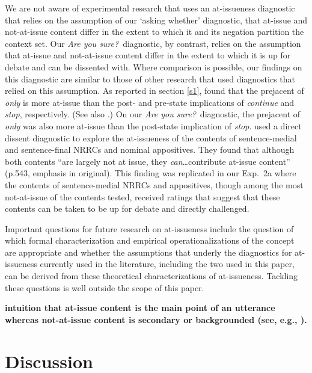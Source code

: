 \documentclass[11pt,fleqn]{article}
\newcommand{\6}{\mbox{$[\hspace*{-.6mm}[$}}
\newcommand{\9}{\mbox{$]\hspace*{-.6mm}]$}}
\begin{document}
We are not aware of experimental research that uses an at-issueness diagnostic that relies on the assumption of our `asking whether' diagnostic, that at-issue and not-at-issue content differ in the extent to which it and its negation partition the context set. Our {\em Are you sure?}~diagnostic, by contrast, relies on the assumption that at-issue and not-at-issue content differ in the extent to which it is up for debate and can be dissented with. Where comparison is possible, our findings on this diagnostic are similar to those of other research that used diagnostics that relied on this assumption. As reported in section \ref{s1}, \citet{amaral-etal11} found that the prejacent of {\em only} is more at-issue than the post- and pre-state implications of {\em continue} and {\em stop}, respectively. (See also \citealt{cummins-etal2012}.) On our {\em Are you sure?}~diagnostic, the prejacent of {\em only} was also more at-issue than the post-state implication of {\em stop}. \citet{syrett-koev2015} used a direct dissent diagnostic to explore the at-issueness of the contents of sentence-medial and sentence-final NRRCs and nominal appositives. They found that although both contents ``are largely not at issue, they {\em can}\ldots contribute at-issue content'' (p.543, emphasis in original). This finding was replicated in our Exp.~2a where the contents of sentence-medial NRRCs and appositives, though among the most not-at-issue of the contents tested, received ratings that suggest that these contents can be taken to be up for debate and directly challenged.

Important questions for future research on at-issueness include the question of which formal characterization and empirical operationalizations of the concept are appropriate and whether the assumptions that underly the diagnostics for at-issueness currently used in the literature, including the two used in this paper, can be derived from these theoretical characterizations of at-issueness. Tackling these questions is well outside the scope of this paper.
 
{\bf intuition that at-issue content is the main point of an utterance whereas not-at-issue content is secondary or backgrounded (see, e.g., \citealt{lyons77,papafragou00,faller02,potts05,amaral-etal07}). }

\section{Discussion}\label{s5}
\end{document}
